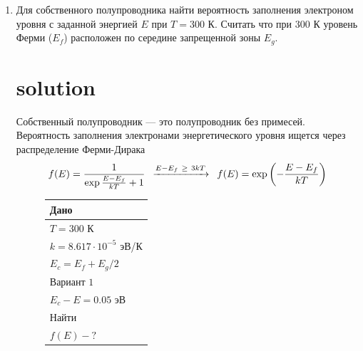 \documentclass[12pt,a4paper]{article}
\theoremstyle{plain}
\theoremstyle{definition}
\theoremstyle{remark}
\numberwithin{equation}{section}
\begin{document}
\begin{enumerate}
    \item Для собственного полупроводника найти вероятность заполнения электроном уровня с
    заданной энергией $E$ при $T=300$ К. Считать что при $300$ К уровень Ферми ($E_f$)
    расположен по середине запрещенной зоны $E_g$.

    \section*{solution}    

    \qquad Собственный полупроводник — это полупроводник без примесей. Вероятность заполнения 
    электронами энергетического уровня ищется через распределение Ферми-Дирака
    {\begin{equation*}
        f(E) = \frac{1}{\exp{\frac{E - E_f}{kT}} + 1} \enskip \xrightarrow{E - E_f\ \ge\ 3kT}  
        \enskip f(E) = \exp\left({-\frac{E - E_f}{kT}}\right)
    \end{equation*}}
    \begin{figure}[H]
        \hspace{2em}
        \begin{minipage}[t]{0.28\textwidth}
            \vspace{0pt}
            \begin{tabularx}{\linewidth}{|X|}
                \hline
                Дано \\
                \hline
                $T = 300$ К \\
                $k = 8.617 \cdot 10^{-5}$ эВ/К \\
                $E_c = E_f + E_g/2$ \\
                \hline 
                Вариант $1$ \\
                \hline 
                $E_c - E = 0.05$ эВ \\
                \hline
                Найти \\
                \hline
                $f(E) - ?$ \\
                \hline
            \end{tabularx}
            
            \vspace{0.5em}
            

\end{minipage}
\end{figure}
\end{enumerate}
\end{document}
